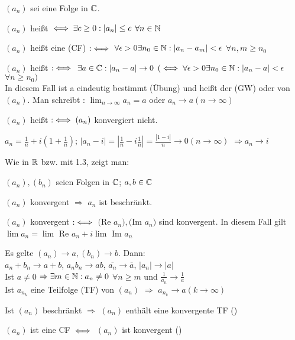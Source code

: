 \documentclass[a4paper,twoside,DIV15,BCOR12mm]{scrbook}
\def\gdw{\equizu}
\def\gdw{\equizu}
\begin{document}
\begin{definition}
$(a_n)$ sei eine Folge in $\mathbb{C}$.
\begin{liste}
	\item $(a_n)$ heißt  $\gdw \exists c \geq 0 : |a_n| \leq c$ $\forall n \in \mathbb{N}$
	\item $(a_n)$ heißt eine  (CF) $:\gdw$ $\forall \epsilon > 0 \exists n_0 \in \mathbb{N} : |a_n-a_m|< \epsilon $ $\forall n,m \geq n_0$
	\item $(a_n)$ heißt  $:\gdw$ $\exists a \in \mathbb{C} : |a_n -a | \to 0$ $ ( \gdw \forall \epsilon > 0 \exists n_0 \in \MdN : |a_n - a| < \epsilon$ $\forall n \geq n_0)$ \\
	      In diesem Fall ist a eindeutig bestimmt (Übung) und heißt der  (GW) oder  von $(a_n)$. Man schreibt : $\lim_{n \to \infty} a_n = a$ oder $a_n \to a (n \to \infty)$ 
	\item $(a_n)$ heißt  $:\gdw (a_n)$ konvergiert nicht.
\end{liste}
\end{definition}

\begin{beispiel}
$a_n = \frac{1}{n} + i(1+\frac{1}{n})$; $|a_n -i| = |\frac{1}{n}-i\frac{1}{n}| = \frac{|1-i|}{n} \to 0 (n \to \infty)$
$\Rightarrow a_n \to i$
\end{beispiel}
Wie in $\mathbb{R}$ bzw. mit 1.3, zeigt man:

\begin{satz}
$(a_n),(b_n)$ seien Folgen in $\mathbb{C}$; $a,b \in \mathbb{C}$
\begin{liste}
	\item $(a_n)$ konvergent $\Rightarrow$ $a_n$ ist beschränkt.
	\item $(a_n)$ konvergent $:\gdw$ $($Re $ a_n), ($Im $a_n)$ sind konvergent. In diesem Fall gilt $\lim a_n = \lim$ Re $a_n + i \lim$ Im $a_n$
	\item Es gelte $(a_n) \to a, (b_n) \to b$. Dann: \\ $a_n+b_n \to a+b$, $a_nb_n \to ab$, $\bar{a_n} \to \bar{a}$, $|a_n| \to |a|$ \\
		  Ist $a \neq 0$ $\Rightarrow \exists m \in \mathbb{N} : a_n \neq 0$ $\forall n \geq m$ und $\frac{1}{a_n} \to \frac{1}{a}$ \\
		  Ist $a_{n_k}$ eine Teilfolge (TF) von $(a_n)$ $\Rightarrow$ $a_{n_k} \to a (k \to \infty)$
	\item Ist $(a_n)$ beschränkt $\Rightarrow$ $(a_n)$ enthält eine konvergente TF ()
	\item $(a_n)$ ist eine CF $\gdw$ $(a_n)$ ist konvergent ()
\end{liste}
\end{satz}
\end{document}
